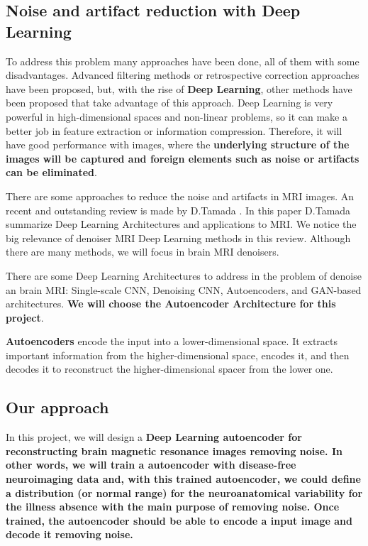 \subsection{Noise and artifact reduction with Deep Learning}

To address this problem many approaches have been done, all of them with some disadvantages. Advanced filtering methods \cite{filtermeth12} or retrospective correction approaches have been proposed, but, with the rise of \textbf{Deep Learning}, other methods have been proposed that take advantage of this approach. Deep Learning is very powerful in high-dimensional spaces and non-linear problems, so it can make a better job in feature extraction or information compression. Therefore, it will have good performance with images, where the \textbf{underlying structure of the images will be captured and foreign elements such as noise or artifacts can be eliminated}. 

There are some approaches to reduce the noise and artifacts in MRI images. An recent and outstanding review is made by D.Tamada \cite{tamada2020review}. In this paper D.Tamada summarize Deep Learning Architectures and applications to MRI. We notice the big relevance of denoiser MRI Deep Learning methods in this review. Although there are many methods, we will focus in brain MRI denoisers. 

There are some Deep Learning Architectures to address in the problem of denoise an brain MRI: Single-scale CNN, Denoising CNN, Autoencoders, and GAN-based architectures. \textbf{We will choose the Autoencoder Architecture for this project}.

\textbf{Autoencoders} \cite{autoencoder} encode the input into a lower-dimensional space. It extracts important information from the higher-dimensional space, encodes it, and then decodes it to reconstruct the higher-dimensional spacer from the lower one. 



\subsection{Our approach}

\begin{tcolorbox}
In this project, we will design a \textbf{Deep Learning autoencoder for reconstructing brain magnetic resonance images removing noise. In other words, we will train a autoencoder with disease-free neuroimaging data and, with this trained autoencoder, we could define a distribution (or normal range) for the neuroanatomical variability for the illness absence with the main purpose of removing noise. Once trained, the autoencoder should be able to encode a input image and decode it removing noise.}
\end{tcolorbox}

